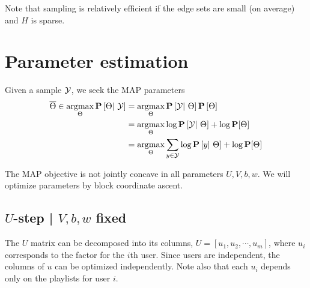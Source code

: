 \documentclass{article}
\begin{document}
Note that sampling is relatively efficient if the edge sets are small (on average) and $H$ is sparse.

\section{Parameter estimation}
Given a sample $\mathcal{Y}$, we seek the MAP parameters 
\begin{align*}
\overline{\Theta} \in \operatorname*{argmax}_\Theta \mathbf{P}\left[\Theta|~ \mathcal{Y}\right] &= \operatorname*{argmax}_\Theta \mathbf{P}\left[\mathcal{Y}|~\Theta\right]\mathbf{P}\left[\Theta\right]\\
&= \operatorname*{argmax}_\Theta \log \mathbf{P}\left[\mathcal{Y}|~\Theta\right] + \log\mathbf{P}[\Theta]\\
&= \operatorname*{argmax}_\Theta \sum_{y\in\mathcal{Y}} \log \mathbf{P}\left[y|~\Theta\right] + \log\mathbf{P}[\Theta]
\end{align*}

The MAP objective is not jointly concave in all parameters $U, V, b, w$.  We will optimize parameters by block coordinate ascent.

\subsection{$U$-step | $V, b, w$ fixed}
The $U$ matrix can be decomposed into its columns, $U = [u_1, u_2, \cdots, u_m]$, where $u_i$ corresponds to the factor for the $i$th user.
Since users are independent, the columns of $u$ can be optimized independently.  Note also that each $u_i$ depends only on the playlists for user $i$.
\end{document}
